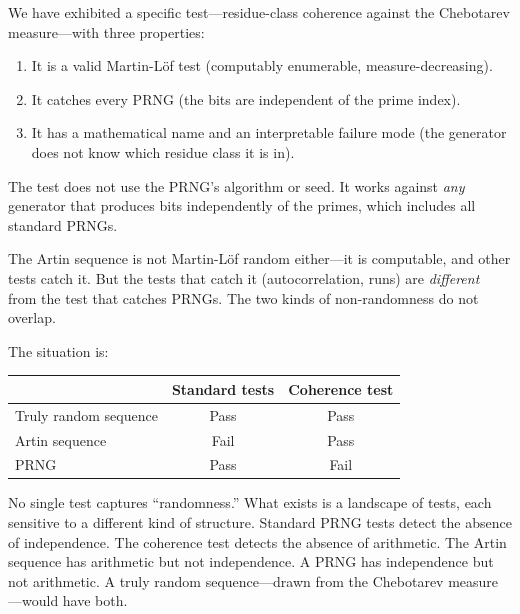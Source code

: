 \documentclass[11pt]{article}
\theoremstyle{definition}
\theoremstyle{remark}
\begin{document}
We have exhibited a specific test---residue-class coherence
against the Chebotarev measure---with three properties:
\begin{enumerate}
\item It is a valid Martin-L\"of test
  (computably enumerable, measure-decreasing).
\item It catches every PRNG
  (the bits are independent of the prime index).
\item It has a mathematical name and an interpretable failure mode
  (the generator does not know which residue class it is in).
\end{enumerate}

The test does not use the PRNG's algorithm or seed.
It works against \emph{any} generator that produces bits
independently of the primes,
which includes all standard PRNGs.

The Artin sequence is not Martin-L\"of random either---it
is computable, and other tests catch it.
But the tests that catch it (autocorrelation, runs)
are \emph{different} from the test that catches PRNGs.
The two kinds of non-randomness do not overlap.

\medskip

The situation is:
\begin{center}
\begin{tabular}{lcc}
\toprule
& Standard tests & Coherence test \\
\midrule
Truly random sequence & Pass & Pass \\
Artin sequence & Fail & Pass \\
PRNG & Pass & Fail \\
\bottomrule
\end{tabular}
\end{center}

\medskip

No single test captures ``randomness.''
What exists is a landscape of tests,
each sensitive to a different kind of structure.
Standard PRNG tests detect the absence of independence.
The coherence test detects the absence of arithmetic.
The Artin sequence has arithmetic but not independence.
A PRNG has independence but not arithmetic.
A truly random sequence---drawn from the Chebotarev measure---would
have both.
\end{document}
